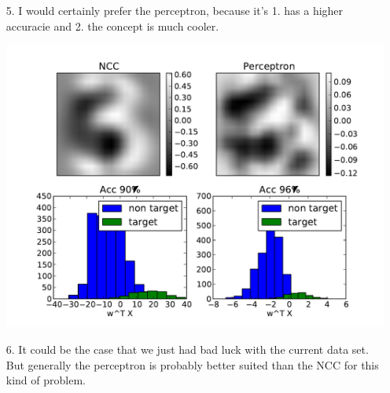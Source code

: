 \documentclass[a4paper,10pt]{article}
\begin{document}
\begin{enumerate}
    \item[5.] I would certainly prefer the perceptron, because it's 1. has a higher accuracie and 2. the concept is much cooler.\\ \begin{center}\includegraphics[scale=0.5]{./task_5_340528_341455.pdf}\end{center}
    \item[6.] It could be the case that we just had bad luck with the current data set. But generally the perceptron is probably better suited than the NCC for this kind of problem.
\end{enumerate}
\end{document}
